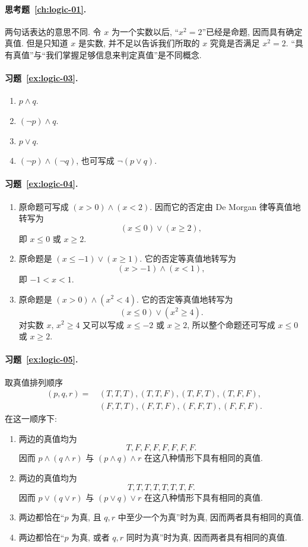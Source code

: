\documentclass[usesamecnt, thmcnt=section, lang=cn, newtx, 10pt, scheme=chinese]{elegantbook}
\begin{document}
\paragraph*{思考题~\ref{ch:logic-01}.}
两句话表达的意思不同. 令 $x$ 为一个实数以后, ``$x^2=2$''已经是命题, 因而具有确定真值. 但是只知道 $x$ 是实数, 并不足以告诉我们所取的 $x$ 究竟是否满足 $x^2=2$. ``具有真值''与``我们掌握足够信息来判定真值''是不同概念.

\paragraph*{习题~\ref{ex:logic-03}.}
\begin{enumerate}[label=\rm(\arabic*)]
  \item $p\wedge q$.
  \item $(\neg p)\wedge q$.
  \item $p\vee q$.
  \item $(\neg p)\wedge(\neg q)$, 也可写成 $\neg(p\vee q)$.
\end{enumerate}

\paragraph*{习题~\ref{ex:logic-04}.}
\begin{enumerate}[label=\rm(\arabic*)]
  \item 原命题可写成 $(x>0)\wedge(x<2)$. 因而它的否定由 De Morgan 律等真值地转写为
  \[
    (x\leq0)\vee(x\geq2),
  \]
  即 $x\leq0$ 或 $x\geq2$.
  \item 原命题是 $(x\leq-1)\vee(x\geq1)$. 它的否定等真值地转写为
  \[
    (x>-1)\wedge(x<1),
  \]
  即 $-1<x<1$.
  \item 原命题是 $(x>0)\wedge(x^2<4)$. 它的否定等真值地转写为
  \[
    (x\leq0)\vee(x^2\geq4).
  \]
  对实数 $x$, $x^2\geq4$ 又可以写成 $x\leq-2$ 或 $x\geq2$, 所以整个命题还可写成 $x\leq0$ 或 $x\geq2$.
\end{enumerate}

\paragraph*{习题~\ref{ex:logic-05}.}
取真值排列顺序
\[
\begin{aligned}
 (p,q,r)=&\,(T,T,T),(T,T,F),(T,F,T),(T,F,F),\\
          &\,(F,T,T),(F,T,F),(F,F,T),(F,F,F).
\end{aligned}
\]
在这一顺序下:
\begin{enumerate}[label=\rm(\arabic*)]
  \item 两边的真值均为
  \[
    T,F,F,F,F,F,F,F.
  \]
  因而 $p\wedge(q\wedge r)$ 与 $(p\wedge q)\wedge r$ 在这八种情形下具有相同的真值.
  \item 两边的真值均为
  \[
    T,T,T,T,T,T,T,F.
  \]
  因而 $p\vee(q\vee r)$ 与 $(p\vee q)\vee r$ 在这八种情形下具有相同的真值.
  \item 两边都恰在``$p$ 为真, 且 $q,r$ 中至少一个为真''时为真, 因而两者具有相同的真值.
  \item 两边都恰在``$p$ 为真, 或者 $q,r$ 同时为真''时为真, 因而两者具有相同的真值.
\end{enumerate}
\end{document}
